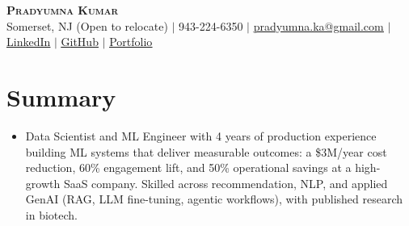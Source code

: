 \documentclass[letterpaper,11pt]{article}
\newcommand{\resumeSubHeadingListStart}{\begin{itemize}[leftmargin=0.15in, label={}]}
\newcommand{\resumeSubHeadingListEnd}{\end{itemize}}
\begin{document}
\begin{center}
    \textbf{\huge \scshape Pradyumna Kumar} \\ \vspace{2pt}
     \small Somerset, NJ (Open to relocate) $|$ \small 943-224-6350 $|$ \href{mailto:pradyumna.ka@gmail.com}{\underline{pradyumna.ka@gmail.com}} $|$
    \href{https://linkedin.com/in/pradyum-kumar/}{\underline{LinkedIn}} $|$
    \href{https://github.com/prad101}{\underline{GitHub}} $|$
    \href{https://prad101.github.io/portfolio/}{\underline{Portfolio}}
\end{center}
\section{Summary}
{\footnotesize
  \resumeSubHeadingListStart
        \item{Data Scientist and ML Engineer with 4 years of production experience building ML systems that deliver measurable outcomes: a \$3M/year cost reduction, 60\% engagement lift, and 50\% operational savings at a high-growth SaaS company. Skilled across recommendation, NLP, and applied GenAI (RAG, LLM fine-tuning, agentic workflows), with published research in biotech.}
    \vspace{-5pt}
  \resumeSubHeadingListEnd
}
\end{document}
